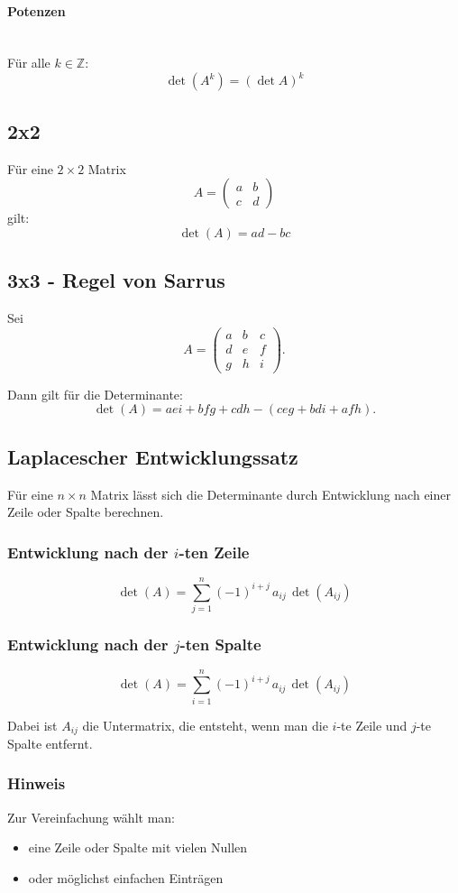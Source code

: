 \documentclass[10pt,a4paper,twocolumn]{article}
\begin{document}
	\paragraph{Potenzen}\mbox{}\\
	Für alle $k\in\mathbb{Z}$:
	\[
	\det(A^{k})=(\det A)^{k}
	\]
	
	\subsection{2x2}
	Für eine $2\times2$ Matrix
	\[
	A=
	\begin{pmatrix}
		a & b\\
		c & d
	\end{pmatrix}
	\]
	gilt:
	\[
	\det(A)=ad-bc
	\]
	
	\subsection{3x3 - Regel von Sarrus}
	Sei
	\[
	A =
	\begin{pmatrix}
		a & b & c\\
		d & e & f\\
		g & h & i
	\end{pmatrix}.
	\]
	
	Dann gilt für die Determinante:
	\[
	\det(A)
	=
	aei + bfg + cdh
	-
	(ceg + bdi + afh).
	\]
	
	\subsection{Laplacescher Entwicklungssatz}
	Für eine $n\times n$ Matrix lässt sich die Determinante durch Entwicklung nach
	einer Zeile oder Spalte berechnen.
	
	\subsubsection*{Entwicklung nach der $i$-ten Zeile}
	\[
	\det(A)=\sum_{j=1}^{n} (-1)^{i+j}\,a_{ij}\,\det(A_{ij})
	\]
	
	\subsubsection*{Entwicklung nach der $j$-ten Spalte}
	\[
	\det(A)=\sum_{i=1}^{n} (-1)^{i+j}\,a_{ij}\,\det(A_{ij})
	\]
	
	Dabei ist $A_{ij}$ die Untermatrix, die entsteht, wenn man die
	$i$-te Zeile und $j$-te Spalte entfernt.
	
	\subsubsection*{Hinweis}
	Zur Vereinfachung wählt man:
	\begin{itemize}
		\item eine Zeile oder Spalte mit vielen Nullen
		\item oder möglichst einfachen Einträgen
	\end{itemize}
	
\end{document}
